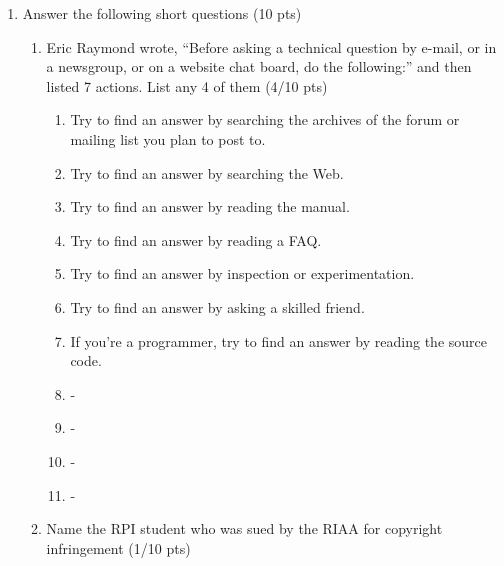 \documentclass[10pt]{article}
\begin{document}
\begin{enumerate}
	\item Answer the following short questions (10 pts)
	\begin{enumerate}
		\item Eric Raymond wrote, ``Before asking a technical question by e-mail, or in a newsgroup, or on a website chat board, do the following:'' and then listed 7 actions. List any 4 of them (4/10 pts)
		\begin{enumerate}[1]
			\beginanswers
			\item Try to find an answer by searching the archives of the forum or mailing list you plan to post to.
			\item Try to find an answer by searching the Web.
			\item Try to find an answer by reading the manual.
			\item Try to find an answer by reading a FAQ.
			\item Try to find an answer by inspection or experimentation.
			\item Try to find an answer by asking a skilled friend.
			\item If you're a programmer, try to find an answer by reading the source code.
			\else
			\item - 
			\bigskip
			\bigskip
			\bigskip
			\bigskip
			\item - 
			\bigskip
			\bigskip
			\bigskip
			\bigskip
			\item - 
			\bigskip
			\bigskip
			\bigskip
			\bigskip
			\item - 
			\bigskip
			\bigskip
			\bigskip
			\bigskip
			\fi
		\end{enumerate}	
	\item Name the RPI student who was sued by the RIAA for copyright infringement (1/10 pts)
	

\end{enumerate}
\end{enumerate}
\end{document}
